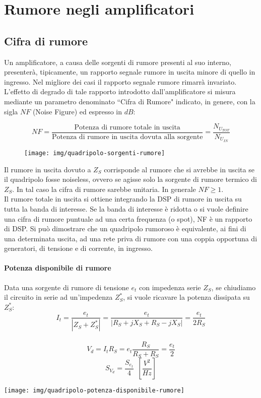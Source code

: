 \section{Rumore negli amplificatori}
\subsection{Cifra di rumore}
Un amplificatore, a causa delle sorgenti di rumore presenti al suo interno, presenterà, tipicamente,
un rapporto segnale rumore in uscita minore di quello in ingresso. Nel migliore dei casi il rapporto segnale rumore rimarrà invariato. L'effetto di degrado di tale rapporto introdotto dall'amplificatore si misura mediante un parametro denominato ``Cifra di Rumore" indicato, in
genere, con la sigla $NF$ (Noise Figure) ed espresso in $dB$:

\[NF = \frac{\mbox{Potenza di rumore totale in uscita}}{\mbox{Potenza di rumore in  uscita dovuta alla sorgente}} = \frac{N_{U_{TOT}}}{N_{U_{IN}}}\]

\begin{figure}[tbh]
	\centering
	\texttt{[image: img/quadripolo-sorgenti-rumore]}
	\caption{}
	\label{fig:cifrarumore-1}
\end{figure}

Il rumore in uscita dovuto a $Z_S$ corrisponde al rumore che si avrebbe in uscita se il quadripolo fosse noiseless,	ovvero se agisse solo la sorgente di rumore termico di $Z_S$. In tal caso la cifra di rumore sarebbe	unitaria. In generale $NF \ge 1$.\\
Il rumore totale in uscita si ottiene integrando la DSP di rumore in uscita su tutta la banda di
interesse. Se la banda di interesse è ridotta o si vuole definire una cifra di rumore puntuale ad una
certa frequenza (o spot), NF è un rapporto di DSP.
Si può dimostrare che un quadripolo rumoroso è equivalente, ai fini di una determinata uscita, ad
una rete priva di rumore con una coppia opportuna di generatori, di tensione e di corrente, in ingresso.

\begin{minipage}{0.7\linewidth}
\paragraph{Potenza disponibile di rumore} Data una sorgente di rumore di tensione $e_t$ con impedenza serie $Z_S$, se chiudiamo il circuito in serie ad un'impedenza $Z_S^*$, si vuole ricavare la potenza dissipata su $Z_S^*$:
      \[I_t = \frac{e_t}{|Z_S + Z_S^*|} = \frac{e_t}{|R_{S} + jX_{S} + R_{S} - jX_{S}|} = \frac{e_t}{2R_{S}}\]\\
\[V_d = I_t R_S = e_t \frac{R_S}{R_S + R_S} = \frac{e_t}{2}\]
\[S_{V_d} = \frac{S_{e_t}}{4}~~\left[\frac{V^2}{Hz}\right]\]
\end{minipage}
\begin{minipage}{0.3\linewidth}
	\centering
	\texttt{[image: img/quadripolo-potenza-disponibile-rumore]}
\end{minipage}

